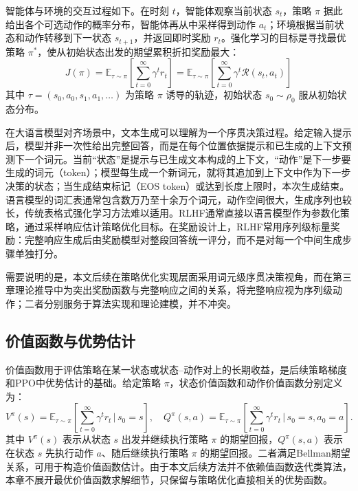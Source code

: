 智能体与环境的交互过程如下。在时刻 $t$，智能体观察当前状态 $s_t$，策略 $\pi$ 据此给出各个可选动作的概率分布，智能体再从中采样得到动作 $a_t$；环境根据当前状态和动作转移到下一状态 $s_{t+1}$，并返回即时奖励 $r_t$。强化学习的目标是寻找最优策略 $\pi^*$，使从初始状态出发的期望累积折扣奖励最大：
\begin{equation}
    J(\pi) = \mathbb{E}_{\tau \sim \pi}\left[\sum_{t=0}^{\infty} \gamma^t r_t\right] = \mathbb{E}_{\tau \sim \pi}\left[\sum_{t=0}^{\infty} \gamma^t \mathcal{R}(s_t, a_t)\right]
    \label{eq:rl_objective}
\end{equation}
其中 $\tau = (s_0, a_0, s_1, a_1, \ldots)$ 为策略 $\pi$ 诱导的轨迹，初始状态 $s_0 \sim \rho_0$ 服从初始状态分布。

在大语言模型对齐场景中，文本生成可以理解为一个序贯决策过程。给定输入提示后，模型并非一次性给出完整回答，而是在每个位置依据提示和已生成的上下文预测下一个词元。当前“状态”是提示与已生成文本构成的上下文，“动作”是下一步要生成的词元（token）；模型每生成一个新词元，就将其追加到上下文中作为下一步决策的状态；当生成结束标记（EOS token）或达到长度上限时，本次生成结束。语言模型的词汇表通常包含数万乃至十余万个词元，动作空间很大，生成序列也较长，传统表格式强化学习方法难以适用。RLHF通常直接以语言模型作为参数化策略，通过采样响应估计策略优化目标。在奖励设计上，RLHF常用序列级标量奖励：完整响应生成后由奖励模型对整段回答统一评分，而不是对每一个中间生成步骤单独打分\cite{ouyang2022training}。

需要说明的是，本文后续在策略优化实现层面采用词元级序贯决策视角，而在第三章理论推导中为突出奖励函数与完整响应之间的关系，将完整响应视为序列级动作；二者分别服务于算法实现和理论建模，并不冲突。


\subsection{价值函数与优势估计}

价值函数用于评估策略在某一状态或状态--动作对上的长期收益，是后续策略梯度和PPO中优势估计的基础。给定策略 $\pi$，状态价值函数和动作价值函数分别定义为：
\begin{equation}
    V^\pi(s) = \mathbb{E}_{\tau \sim \pi}\left[\sum_{t=0}^{\infty} \gamma^t r_t \,\bigg|\, s_0 = s\right], \quad
    Q^\pi(s, a) = \mathbb{E}_{\tau \sim \pi}\left[\sum_{t=0}^{\infty} \gamma^t r_t \,\bigg|\, s_0 = s, a_0 = a\right].
    \label{eq:value_functions}
\end{equation}
其中 $V^\pi(s)$ 表示从状态 $s$ 出发并继续执行策略 $\pi$ 的期望回报，$Q^\pi(s,a)$ 表示在状态 $s$ 先执行动作 $a$、随后继续执行策略 $\pi$ 的期望回报。二者满足Bellman期望关系，可用于构造价值函数估计。由于本文后续方法并不依赖值函数迭代类算法，本章不展开最优价值函数求解细节，只保留与策略优化直接相关的优势函数。

